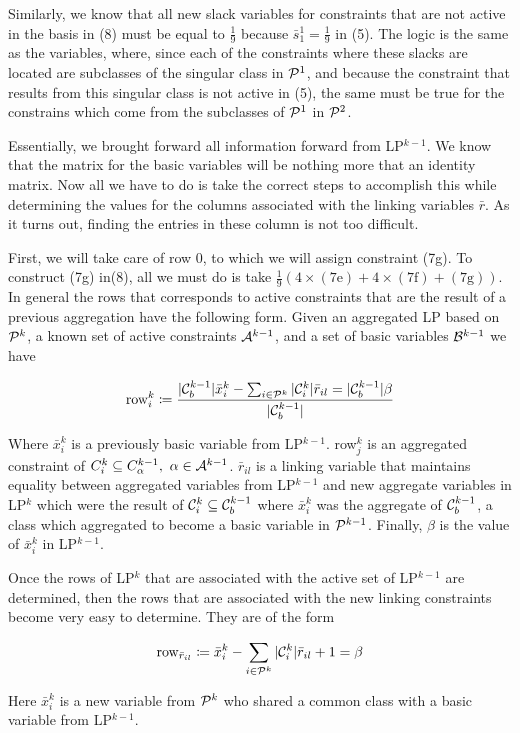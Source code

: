 \documentclass[11pt]{article} %
\newcommand{\cP}{{\cal P}}
\newcommand{\cA}{{\cal A}}
\newcommand{\cC}{{\cal C}}
\newcommand{\cB}{{\cal B}}
\begin{document}
	Similarly, we know that all new slack variables for constraints that are not active in the basis in (8) must be equal to $\frac{1}{9}$ because $\bar{s}_1^1 = \frac{1}{9}$ in (5).  The logic is the same as the variables, where, since each of the constraints where these slacks are located are subclasses of the singular class in $\cP^1$, and because the constraint that results from this singular class is not active in (5), the same must be true for the constrains which come from the subclasses of $\cP^1$ in $\cP^2$.
	
	Essentially, we brought forward all information forward from LP$^{k - 1}$.  We know that the matrix for the basic variables will be nothing more that an identity matrix.  Now all we have to do is take the correct steps to accomplish this while determining the values for the columns associated with the linking variables $\bar{r}$.  As it turns out, finding the entries in these column is not too difficult.
	
	First, we will take care of row 0, to which we will assign constraint (7g).  To construct (7g) in(8), all we must do is take $\frac{1}{9}(4 \times (7\text{e}) + 4 \times (7\text{f}) + (7\text{g}))$.  In general the rows that corresponds to active constraints that are the result of a previous aggregation have the following form.  Given an aggregated LP based on $\cP^k$, a known set of active constraints $\cA^{k - 1}$, and a set of basic variables $\cB^{k - 1}$ we have
	
	\begin{equation}
	\text{row}_{i}^k \coloneqq \frac{|\cC_b^{k - 1}|\bar{x}_i^k - \sum_{i \in \cP^k}|\cC^k_i|\bar{r}_{il} = |\cC^{k - 1}_b|\beta}{|\cC_b^{k - 1}|}
	\end{equation}
	
	Where $\bar{x}_i^k$ is a previously basic variable from LP$^{k - 1}$.  row$_j^k$ is an aggregated constraint of $C_i^k \subseteq C_\alpha^{k - 1}, \ \alpha \in \cA^{k - 1}$.  $\bar{r}_{il}$ is a linking variable that maintains equality between aggregated variables from LP$^{k - 1}$ and new aggregate variables in LP$^k$ which were the result of $\cC_i^k \subseteq \cC_b^{k - 1}$ where $\bar{x}_i^k$ was the aggregate of $\cC_b^{k - 1}$, a class which aggregated to become a basic variable in $\cP^{k - 1}$.  Finally, $\beta$ is the value of $\bar{x}_i^k$ in LP$^{k - 1}$.
		
	Once the rows of LP$^k$ that are associated with the active set of LP$^{k - 1}$ are determined, then the rows that are associated with the new linking constraints become very easy to determine.  They are of the form 
	
	\begin{equation}
	\text{row}_{\bar{r}_{il}} \coloneqq \bar{x}_i^k - \sum_{i \in \cP^k}|\cC^k_i|\bar{r}_{il} + 1 =\beta
	\end{equation} 
	
	Here $\bar{x}_i^k$ is a new variable from $\cP^k$ who shared a common class with a basic variable from LP$^{k - 1}$. 
	
 
\end{document}
